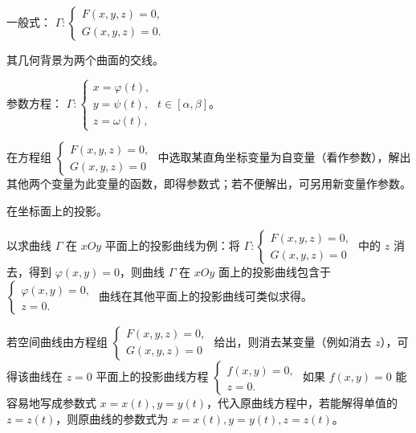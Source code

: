 
 一般式：
$\displaystyle \Gamma:\begin{cases}F(x,y,z)=0,\\G(x,y,z)=0.\end{cases}$

\begin{notebox}
其几何背景为两个曲面的交线。
\end{notebox}

 参数方程：
$\displaystyle \Gamma:\begin{cases}
x=\varphi(t),\\y=\psi(t),\\z=\omega(t),
\end{cases}\ t\in[\alpha,\beta]$。

\begin{notebox}
在方程组 $\begin{cases}F(x,y,z)=0,\\G(x,y,z)=0\end{cases}$ 中选取某直角坐标变量为自变量（看作参数），解出其他两个变量为此变量的函数，即得参数式；若不便解出，可另用新变量作参数。
\end{notebox}

 在坐标面上的投影。

以求曲线 $\Gamma$ 在 $xOy$ 平面上的投影曲线为例：将
$\displaystyle \Gamma:\begin{cases}F(x,y,z)=0,\\G(x,y,z)=0\end{cases}$
中的 $z$ 消去，得到 $\varphi(x,y)=0$，则曲线 $\Gamma$ 在 $xOy$ 面上的投影曲线包含于
$\displaystyle \begin{cases}\varphi(x,y)=0,\\z=0.\end{cases}$
曲线在其他平面上的投影曲线可类似求得。

\begin{notebox}
若空间曲线由方程组 $\begin{cases}F(x,y,z)=0,\\G(x,y,z)=0\end{cases}$ 给出，则消去某变量（例如消去 $z$），可得该曲线在 $z=0$ 平面上的投影曲线方程
$\begin{cases}f(x,y)=0,\\z=0.\end{cases}$
如果 $f(x,y)=0$ 能容易地写成参数式 $x=x(t),y=y(t)$，代入原曲线方程中，若能解得单值的 $z=z(t)$，则原曲线的参数式为 $x=x(t),y=y(t),z=z(t)$。
\end{notebox}

